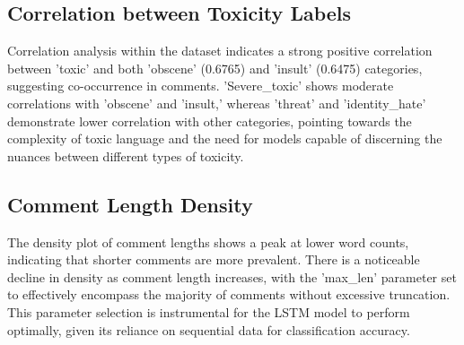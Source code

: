 \subsection{Correlation between Toxicity Labels}
Correlation analysis within the dataset indicates a strong positive correlation between 'toxic' and both 'obscene' (0.6765) and 'insult' (0.6475) categories, suggesting co-occurrence in comments. 'Severe\_toxic' shows moderate correlations with 'obscene' and 'insult,' whereas 'threat' and 'identity\_hate' demonstrate lower correlation with other categories, pointing towards the complexity of toxic language and the need for models capable of discerning the nuances between different types of toxicity.

\subsection{Comment Length Density} The density plot of comment lengths shows a peak at lower word counts, indicating that shorter comments are more prevalent. There is a noticeable decline in density as comment length increases, with the 'max\_len' parameter set to effectively encompass the majority of comments without excessive truncation. This parameter selection is instrumental for the LSTM model to perform optimally, given its reliance on sequential data for classification accuracy.
